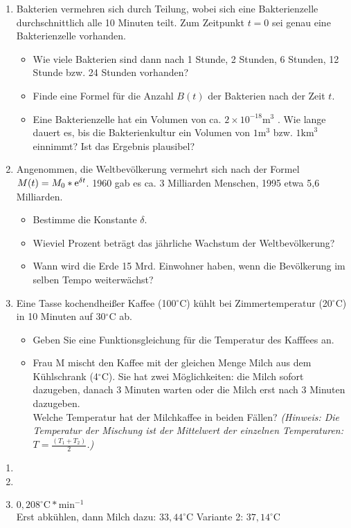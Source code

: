 	\begin{enumerate}
		\item Bakterien vermehren sich durch Teilung, wobei sich eine Bakterienzelle durchschnittlich alle 10 Minuten teilt. Zum Zeitpunkt $t=0$ sei genau eine Bakterienzelle vorhanden.
		\begin{itemize}
			\item Wie viele Bakterien sind dann nach 1 Stunde, 2 Stunden, 6 Stunden, 12 Stunde bzw. 24 Stunden vorhanden?
			\item Finde eine Formel für die Anzahl $B(t)$ der Bakterien nach der Zeit $t$.
			\item Eine Bakterienzelle hat ein Volumen von ca. $2\times10^{-18}\mathrm{m}^3$ . Wie lange dauert es, bis die Bakterienkultur ein Volumen von $1\mathrm{m}^3$ bzw. $1\mathrm{km}^3$ einnimmt? Ist das Ergebnis plausibel?
		\end{itemize}
		\item	Angenommen, die Weltbevölkerung vermehrt sich nach der Formel $M(t)=M_0*\mathrm{e}^{\delta t}$. 1960 gab es ca. 3 Milliarden Menschen, 1995 etwa 5,6 Milliarden.
		\begin{itemize}
			\item Bestimme die Konstante $\delta$.
			\item Wieviel Prozent beträgt das jährliche Wachstum der Weltbevölkerung?
			\item Wann wird die Erde 15 Mrd. Einwohner haben, wenn die Bevölkerung im selben Tempo weiterwächst?
		\end{itemize}
		\item Eine Tasse kochendheißer Kaffee (100$^\circ$C) kühlt bei Zimmertemperatur (20$^\circ$C) in 10 Minuten auf 30$^\circ$C ab.
		\begin{itemize}
			\item Geben Sie eine Funktionsgleichung für die Temperatur des Kafffees an.
			\item Frau M mischt den Kaffee mit der gleichen Menge Milch aus dem Kühlschrank (4$^\circ$C). Sie hat zwei Möglichkeiten: die Milch sofort dazugeben, danach 3 Minuten warten oder die Milch erst nach 3 Minuten dazugeben.\\
	Welche Temperatur hat der Milchkaffee in beiden Fällen?
	\textit{(Hinweis: Die Temperatur der Mischung ist der Mittelwert der einzelnen Temperaturen: $T=\frac{(T_1+T_2)}{2}$.)}
		\end{itemize}
	\end{enumerate}

	\begin{lsg}{}
		\begin{enumerate}
			\item
			\item
			\item $0,208^\circ\mathrm{C} * \mathrm{min}^{-1}$\\
			Erst abkühlen, dann Milch dazu: $33,44^\circ\mathrm{C}$
			Variante 2: $37,14^\circ\mathrm{C}$
		\end{enumerate}
	\end{lsg}

